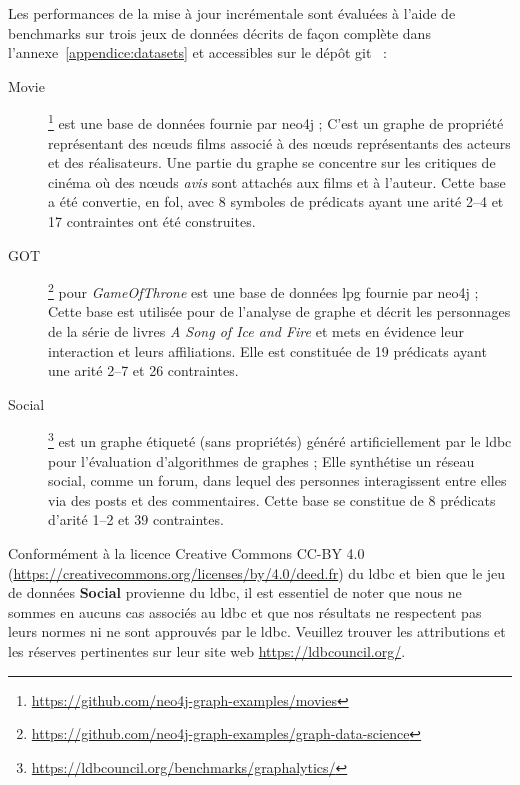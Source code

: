 Les performances de la mise à jour incrémentale sont évaluées à l'aide de benchmarks sur trois jeux de données décrits de façon complète dans l'annexe~\ref{appendice:datasets} et accessibles sur le dépôt \gls{git}~\cite{chabinUpdateChase2023} :
\begin{description}
    \item[Movie]\footnote{\url{https://github.com/neo4j-graph-examples/movies}} est une base de données fournie par \gls{neo4j} ;
          C'est un graphe de propriété représentant des nœuds films associé à des nœuds représentants des acteurs et des réalisateurs.
          Une partie du graphe se concentre sur les critiques de cinéma où des nœuds \emph{avis} sont attachés aux films et à l'auteur.
          Cette base a été convertie, en \gls{fol}, avec \num{8} symboles de prédicats ayant une arité \numrange{2}{4} et \num{17} contraintes ont été construites.
    \item[GOT]\footnote{\url{https://github.com/neo4j-graph-examples/graph-data-science}} pour \emph{GameOfThrone} est une base de données \gls{lpg} fournie par \gls{neo4j} ;
          Cette base est utilisée pour de l'analyse de graphe et décrit les personnages de la série de livres \emph{A Song of Ice and Fire} et mets en évidence leur interaction et leurs affiliations.
          Elle est constituée de \num{19} prédicats ayant une arité \numrange{2}{7} et \num{26} contraintes.
    \item[Social]\footnote{\url{https://ldbcouncil.org/benchmarks/graphalytics/}} est un graphe étiqueté (sans propriétés) généré artificiellement par le \gls{ldbc} pour l'évaluation d'algorithmes de graphes ;
          Elle synthétise un réseau social, comme un forum, dans lequel des personnes interagissent entre elles via des posts et des commentaires.
          Cette base se constitue de \num{8} prédicats d'arité \numrange{1}{2} et \num{39} contraintes.
\end{description}

\begin{remark}
    Conformément à la licence Creative Commons CC-BY 4.0 (\url{https://creativecommons.org/licenses/by/4.0/deed.fr}) du \gls{ldbc} et bien que le jeu de données \textbf{Social} provienne du \gls{ldbc}, il est essentiel de noter que nous ne sommes en aucuns cas associés au \gls{ldbc} et que nos résultats ne respectent pas leurs normes ni ne sont approuvés par le \gls{ldbc}.
    Veuillez trouver les attributions et les réserves pertinentes sur leur site web \url{https://ldbcouncil.org/}.
\end{remark}

